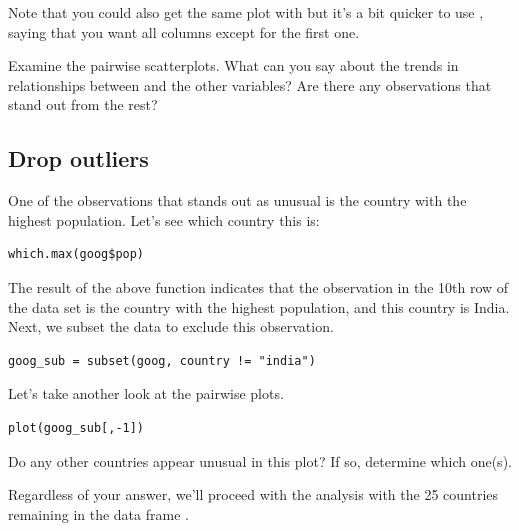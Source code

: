 \documentclass[11pt]{article}
\newcommand{\soln}[1]{ }	%
\begin{document}
Note that you could also get the same plot with  but it's a bit quicker to use \code{[,-1]}, saying that you want all columns except for the first one.

\begin{exercise}
Examine the pairwise scatterplots. What can you say about the trends in relationships between  and the other variables? Are there any observations that stand out from the rest?
\end{exercise}
\soln{None of the variables seem to have a particularly linear relationship with \% complied. Perhaps the strongest linear relationship is between \% complied and HDI. There appears to be at least one outlier, the country with the highest population.}

\subsection*{Drop outliers}

One of the observations that stands out as unusual is the country with the highest population. Let's see which country this is:

\begin{lstlisting}
which.max(goog$pop)
\end{lstlisting}

The result of the above function indicates that the observation in the 10th row of the data set is the country with the highest population, and this country is India. Next, we subset the data to exclude this observation.

\begin{lstlisting}
goog_sub = subset(goog, country != "india")
\end{lstlisting}

Let's take another look at the pairwise plots.

\begin{lstlisting}
plot(goog_sub[,-1])
\end{lstlisting}

\begin{exercise}
Do any other countries appear unusual in this plot? If so, determine which one(s).
\end{exercise}
\soln{The country with the highest number of requests (US) appears unusual.}

Regardless of your answer, we'll proceed with the analysis with the 25 countries remaining in the data frame .
\end{document}
